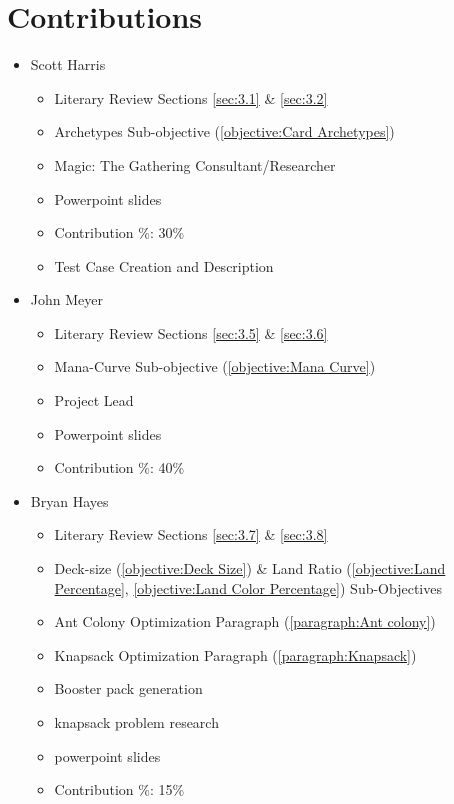 \documentclass[12pt, letterpaper]{article}
\begin{document}
\section{Contributions}

\begin{itemize}

\item Scott Harris

\begin{itemize}

    \item Literary Review Sections \ref{sec:3.1} \& \ref{sec:3.2}
    \item Archetypes Sub-objective (\ref{objective:Card Archetypes})
    \item Magic: The Gathering Consultant/Researcher
	\item Powerpoint slides
    \item Contribution \%: 30\%
    \item Test Case Creation and Description

\end{itemize}

\item John Meyer

\begin{itemize}

    \item Literary Review Sections \ref{sec:3.5} \& \ref{sec:3.6}
    \item Mana-Curve Sub-objective (\ref{objective:Mana Curve})
    \item Project Lead
	\item Powerpoint slides
    \item Contribution \%: 40\%

\end{itemize}

\item Bryan Hayes

\begin{itemize}

    \item Literary Review Sections \ref{sec:3.7} \& \ref{sec:3.8}
    \item Deck-size (\ref{objective:Deck Size}) \&
        Land Ratio (\ref{objective:Land Percentage}, \ref{objective:Land Color Percentage}) Sub-Objectives
    \item Ant Colony Optimization Paragraph (\ref{paragraph:Ant colony})
	\item Knapsack Optimization Paragraph (\ref{paragraph:Knapsack})
	\item Booster pack generation
	\item knapsack problem research
	\item powerpoint slides
    \item Contribution \%: 15\%


\end{itemize}
\end{itemize}
\end{document}
